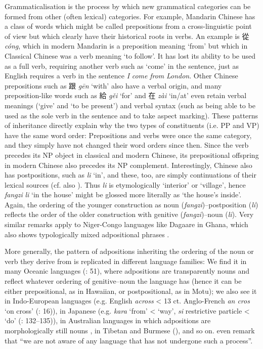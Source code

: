 \documentclass[output=paper]{langsci/langscibook}
\begin{document}
Grammaticalisation is the process by which new grammatical categories can be formed from other (often lexical) categories. For example, Mandarin Chinese has a class of words which might be called prepositions from a cross-linguistic point of view but which clearly have their historical roots in verbs. An example is 從 \textit{cóng}, which in modern Mandarin is a preposition meaning ‘from’ but which in Classical Chinese was a verb meaning ‘to follow’. It has lost its ability to be used as a full verb, requiring another verb such as ‘come’ in the sentence, just as English requires a verb in the sentence \textit{I} \textit{come} \textit{from} \textit{London}. Other Chinese prepositions such as 跟 \textit{gēn} ‘with’ also have a verbal origin, and many preposition-like words such as 給 \textit{gěi} ‘for’ and 在 \textit{zài} ‘in/at’ even retain verbal meanings (‘give’ and ‘to be present’) and verbal syntax (such as being able to be used as the sole verb in the sentence and to take aspect marking). These patterns of inheritance directly explain why the two types of constituents (i.e. PP and VP) have the same word order: Prepositions and verbs were once the same category, and they simply have not changed their word orders since then. Since the verb precedes its NP object in classical and modern Chinese, its prepositional offspring in modern Chinese also precedes its NP complement. Interestingly, Chinese also has postpositions, such as \textit{li} ‘in’, and these, too, are simply continuations of their lexical sources (cf. also ). Thus \textit{li} is etymologically ‘interior’ or ‘village’, hence \textit{fangzi} \textit{li} ‘in the house’ might be glossed more literally as ‘the house’s inside’. Again, the ordering of the younger construction as noun (\textit{fangzi})–postposition (\textit{li}) reflects the order of the older construction with genitive (\textit{fangzi})–noun (\textit{li}). Very similar remarks apply to Niger-Congo languages like Dagaare in Ghana, which also shows typologically mixed adpositional phrases \citep{Bodomo1997}. 

More generally, the pattern of adpositions inheriting the ordering of the noun or verb they derive from is replicated in different language families: We find it in many Oceanic languages (\citealt{LynchEtAl2002}: 51), where adpositions are transparently nouns and reflect whatever ordering of genitive–noun the language has (hence it can be either prepositional, as in Hawaiian, or postpositional, as in Motu); we also see it in Indo-European languages (e.g. English \textit{across} < 13 ct. Anglo-French \textit{an cros} ‘on cross’ (\citealt{BordetJamet2010}: 16)), in Japanese (e.g. \textit{kara} ‘from’ < ‘way’, \textit{si} restrictive particle < ‘do’ (\citealt{Frellesvig2010}: 132–135)), in Australian languages in which adpositions are morphologically still nouns \citep{Dixon2002}, in Tibetan and Burmese (\citealt{DeLancey1997}), and so on. \citet[62]{HeineKuteva2007} even remark that “we are not aware of any language that has not undergone such a process”.
\end{document}
